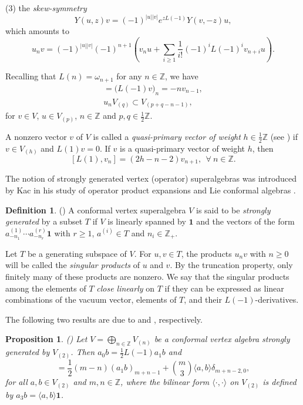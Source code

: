 \documentclass[12pt]{article}
\numberwithin{equation}{section}
\newtheorem{proposition}[theorem]{Proposition}
\theoremstyle{definition}
\newtheorem{definition}[theorem]{Definition}
\theoremstyle{plain}
\newcommand{\bZ}{\ensuremath{\mathbb{Z}}}
\newcommand{\subno}[1]{\noindent\textnormal{(#1)}}
\newcommand{\bone}{\mathbf{1 }}
\begin{document}
\subno{3} the \emph{skew-symmetry}
\begin{equation*}
    Y(u,z)v=(-1)^{|u||v|}e^{zL(-1)}Y(v,-z)u,
\end{equation*}
which amounts to
\begin{equation}\label{skew.symm}
    u_nv=(-1)^{|u||v|}(-1)^{n+1}\left(v_nu+\sum_{i\ge1}\frac{1}{i!}(-1)^iL(-1)^iv_{n+i}u\right).
\end{equation}

Recalling that $ L(n)=\omega_{n+1}$ for any $n\in\bZ$, we have 
\begin{gather}
    [L(-1),v_n]=\big(L(-1)v\big)_n=-nv_{n-1},\label{der}\\
    u_nV_{(q)}\subset V_{(p+q-n-1)},\label{wt}
\end{gather}
for $v\in V$, $u\in V_{(p)}$, $n\in\bZ$ and $p,q\in\frac{1}{2}\bZ$.

A nonzero vector $v$ of $V$ is called a \emph{quasi-primary vector of weight} $h\in\frac{1}{2}\bZ$ (see \cite{FHL}) if $v\in V_{(h)}$ and $L(1)v=0$. If $v$ is a quasi-primary vector of weight $h$, then
\begin{equation}\label{quasi.prim}
    [L(1),v_n]=(2h-n-2)v_{n+1},\ \ \forall\ n\in\bZ.
\end{equation}


The notion of strongly generated vertex (operator) superalgebras was introduced by Kac in his study of operator product expansions and Lie conformal algebras \cite{K98}.

\begin{definition}\textup{(\cite{K98})}
    A conformal vertex superalgebra $V$ is said to be \emph{strongly generated} by a subset $T$ if $V$ is linearly spanned by $\bone$ and the vectors of the form $a^{(1)}_{-n_1}\cdots a^{(r)}_{-n_r}\bone$ with $r\ge 1$, $a^{(i)}\in T$ and $n_i\in\bZ_+$.
\end{definition}

Let $T$ be a generating subspace of $V$. For $u,v\in T$, the products $u_nv$ with $n\geq0$ will be called the \emph{singular products} of $u$ and $v$. By the truncation property, only finitely many of these products are nonzero. We say that the singular products among the elements of $T$ \emph{close linearly} on $T$ if they can be expressed as linear combinations of the vacuum vector, elements of $T$, and their $L(-1)$-derivatives.

The following two results are due to \cite{Lam} and \cite{LY}, respectively.
\begin{proposition}\label{prop:Lam}\textup{(\cite{Lam})}
Let $V=\bigoplus_{n\in\bZ}V_{(n)}$ be a conformal vertex algebra strongly generated by $V_{(2)}$. Then $a_0b=\frac12L(-1)a_1b$ and
\begin{equation*}
    [a_m,b_n]=\frac12(m-n)(a_1b)_{m+n-1}+\binom{m}{3}\langle a,b\rangle\delta_{m+n-2,0},
\end{equation*}
for all $a,b\in V_{(2)}$ and $m,n\in\bZ$, where the
bilinear form $\langle\cdot,\cdot\rangle$ on $V_{(2)}$ is defined by $a_3b=\langle a,b\rangle\bone$.
\end{proposition}
\end{document}
